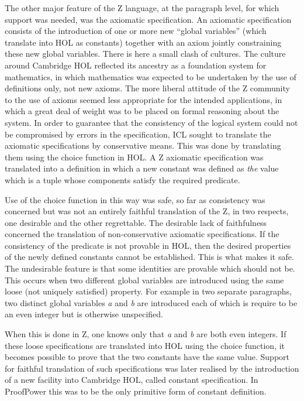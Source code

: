 \documentclass[10pt,titlepage]{book}
\begin{document}
The other major feature of the Z language, at the paragraph level, for which support was needed, was the axiomatic specification.
An axiomatic specification consists of the introduction of one or more new ``global variables'' (which translate into HOL as constants) together with an axiom jointly constraining these new global variables.
There is here a small clash of cultures.
The culture around Cambridge HOL reflected its ancestry as a foundation system for mathematics, in which mathematics was expected to be undertaken by the use of definitions only, not new axioms.
The more liberal attitude of the Z community to the use of axioms seemed less appropriate for the intended applications, in which a great deal of weight was to be placed on formal reasoning about the system.
In order to guarantee that the consistency of the logical system could not be compromised by errors in the specification, ICL sought to translate the axiomatic specifications by conservative means.
This was done by translating them using the choice function in HOL.
A Z axiomatic specification was translated into a definition in which a new constant was defined as {\it the} value which is a tuple whose components satisfy the required predicate.

Use of the choice function in this way was safe, so far as consistency was concerned but was not an entirely faithful translation of the Z, in two respects, one desirable and the other regrettable.
The desirable lack of faithfulness concerned the translation of non-conservative axiomatic specifications.
If the consistency of the predicate is not provable in HOL, then the desired properties of the newly defined constants cannot be established.
This is what makes it safe.
The undesirable feature is that some identities are provable which should not be.
This occurs when two different global variables are introduced using the same loose (not uniquely satisfied) property.
For example in two separate paragraphs, two distinct global variables {\it a} and {\it b} are introduced each of which is require to be an even integer but is otherwise unspecified.

When this is done in Z, one knows only that {\it a} and {\it b} are both even integers.
If these loose specifications are translated into HOL using the choice function, it becomes possible to prove that the two constants have the same value.
Support for faithful translation of such specifications was later realised by the introduction of a new facility into Cambridge HOL, called constant specification.
In ProofPower this was to be the only primitive form of constant definition.
\end{document}
